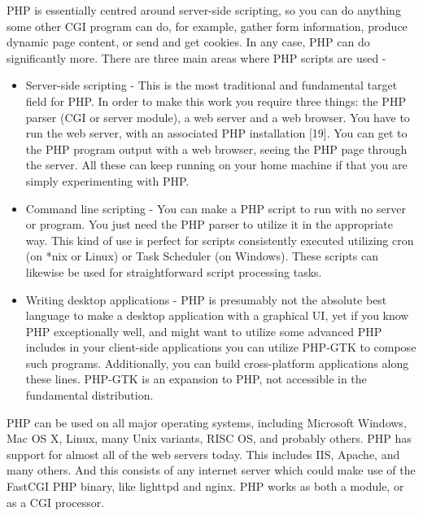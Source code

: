 \documentclass[../thesis.tex]{subfiles}
\begin{document}
\vspace{5mm}
PHP is essentially centred around server-side scripting, so you can do anything some other CGI program can do, for example, gather form information, produce dynamic page content, or send and get cookies. In any case, PHP can do significantly more.
\vspace{5mm}
There are three main areas where PHP scripts are used -
\vspace{5mm}
\begin{itemize}
\item Server-side scripting -  This is the most traditional and fundamental target field for PHP. In order to make this work you require three things: the PHP parser (CGI or server module), a web server and a web browser. You have to run the web server, with an associated PHP installation [19]. You can get to the PHP program output with a web browser, seeing the PHP page through the server. All these can keep running on your home machine if that you are simply experimenting with PHP.
\vspace{5mm}
\item Command line scripting - You can make a PHP script to run with no server or program. You just need the PHP parser to utilize it in the appropriate way. This kind of use is perfect for scripts consistently executed utilizing cron (on *nix or Linux) or Task Scheduler (on Windows). These scripts can likewise be used for straightforward script processing tasks.
\vspace{5mm}
\item Writing desktop applications - PHP is presumably not the absolute best language to make a desktop application with a graphical UI, yet if you know PHP exceptionally well, and might want to utilize some advanced PHP includes in your client-side applications you can utilize PHP-GTK to compose such programs. Additionally, you can build cross-platform applications along these lines. PHP-GTK is an expansion to PHP, not accessible in the fundamental distribution.
\end{itemize}
\vspace{5mm}
PHP can be used on all major operating systems, including Microsoft Windows, Mac OS X, Linux, many Unix variants, RISC OS, and probably others. PHP has support for almost all of the web servers today. This includes IIS, Apache, and many others. And this consists of any internet server which could make use of the FastCGI PHP binary, like lighttpd and nginx. PHP works as both a module, or as a CGI processor.
\vspace{5mm}
\end{document}
